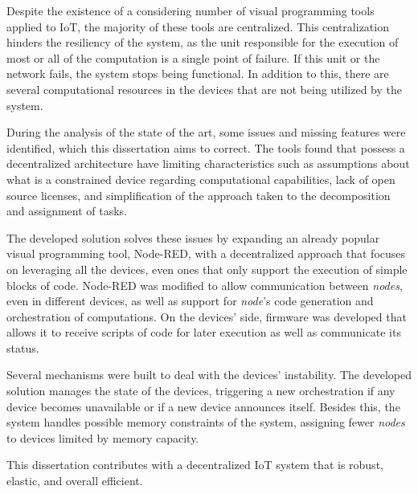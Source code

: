 Despite the existence of a considering number of visual programming tools applied to IoT, the majority of these tools are centralized. This centralization hinders the resiliency of the system, as the unit responsible for the execution of most or all of the computation is a single point of failure. If this unit or the network fails, the system stops being functional. In addition to this, there are several computational resources in the devices that are not being utilized by the system.

During the analysis of the state of the art, some issues and missing features were identified, which this dissertation aims to correct. The tools found that possess a decentralized architecture have limiting characteristics such as assumptions about what is a constrained device regarding computational capabilities, lack of open source licenses, and simplification of the approach taken to the decomposition and assignment of tasks.

The developed solution solves these issues by expanding an already popular visual programming tool, Node-RED, with a decentralized approach that focuses on leveraging all the devices, even ones that only support the execution of simple blocks of code. Node-RED was modified to allow communication between \textit{nodes}, even in different devices, as well as support for \textit{node}'s code generation and orchestration of computations. On the devices' side, firmware was developed that allows it to receive scripts of code for later execution as well as communicate its status. 

Several mechanisms were built to deal with the devices' instability. The developed solution manages the state of the devices, triggering a new orchestration if any device becomes unavailable or if a new device announces itself. Besides this, the system handles possible memory constraints of the system, assigning fewer \textit{nodes} to devices limited by memory capacity.

This dissertation contributes with a decentralized IoT system that is robust, elastic, and overall efficient.
